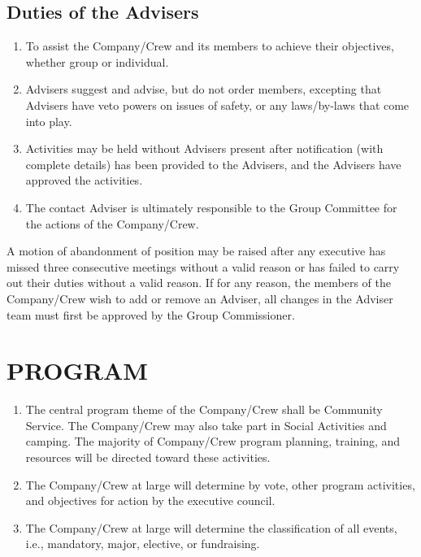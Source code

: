 \documentclass{Service_Corps_Document}
\begin{document}
\subsection{Duties of the Advisers}
\begin{enumerate}
	\item To assist the Company/Crew and its members to achieve their objectives, whether group or individual.
	\item Advisers suggest and advise, but do not order members, excepting that Advisers have veto powers on issues of safety, or any laws/by-laws that come into play.
	\item Activities may be held without Advisers present after notification (with complete details) has been provided to the Advisers, and the Advisers have approved the activities.
	\item The contact Adviser is ultimately responsible to the Group Committee for the actions of the Company/Crew. 
\end{enumerate}
A motion of abandonment of position may be raised after any executive has missed three consecutive meetings without a valid reason or has failed to carry out their duties without a valid reason. If for any reason, the members of the Company/Crew wish to add or remove an Adviser, all changes in the Adviser team must first be approved by the Group Commissioner. 
\section{PROGRAM}
\begin{enumerate}
	\item The central program theme of the Company/Crew shall be Community Service. The Company/Crew may also take part in Social Activities and camping. The majority of Company/Crew program planning, training, and resources will be directed toward these activities. 
	\item The Company/Crew at large will determine by vote, other program activities, and objectives for action by the executive council.
	\item The Company/Crew at large will determine the classification of all events, i.e., mandatory, major, elective, or fundraising.
\end{enumerate}
\end{document}
